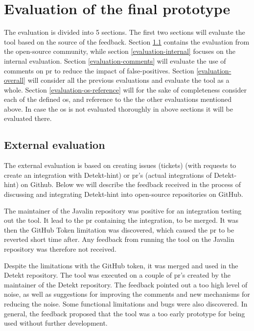 \documentclass[pdftex,10pt,b5paper,twoside]{report}
\begin{document}
\section{Evaluation of the final prototype}
\label{evaluation-final-prototype}
The evaluation is divided into 5 sections. The first two sections will evaluate the tool based on the source of the feedback. Section \ref{evaluation-open-source} contains the evaluation from the open-source community, while section \ref{evaluation-internal} focuses on the internal evaluation. Section \ref{evaluation-comments} will evaluate the use of comments on \gls{pr} to reduce the impact of false-positives. Section \ref{evaluation-overall} will consider all the previous evaluations and evaluate the tool as a whole. Section \ref{evaluation-os-reference} will for the sake of completeness consider each of the defined \gls{os}, and reference to the the other evaluations mentioned above. In case the \gls{os} is not evaluated thoroughly in above sections it will be evaluated there.

\subsection{External evaluation}
\label{evaluation-open-source}
The external evaluation is based on creating issues (tickets) (with requests to create an integration with Detekt-hint) or \gls{pr}'s (actual integrations of Detekt-hint) on Github. Below we will describe the feedback received in the process of discussing and integrating Detekt-hint into open-source repositories on GitHub. 

The maintainer of the Javalin repository was positive for an integration testing out the tool. It lead to the \gls{pr} containing the integration, to be merged. It was then the GitHub Token limitation was discovered, which caused the \gls{pr} to be reverted short time after. Any feedback from running the tool on the Javalin repository was therefore not received. 

Despite the limitations with the GitHub token, it was merged and used in the Detekt repository. The tool was executed on a couple of \gls{pr}'s created by the maintainer of the Detekt repository. The feedback pointed out a too high level of noise, as well as suggestions for improving the comments and new mechanisms for reducing the noise. Some functional limitations and bugs were also discovered. In general, the feedback proposed that the tool was a too early prototype for being used without further development.
\end{document}
